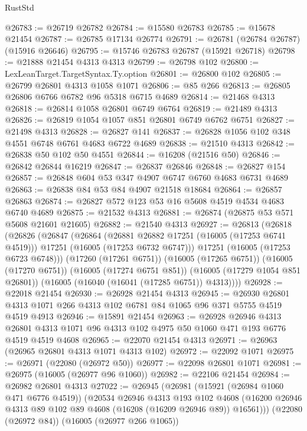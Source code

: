 \begin{lexlean}{RustStd}
\begin{coremodule}
@26783 := @26719 @26782
@26784 := @15580 @26783
@26785 := @15678 @21454
@26787 := @26785 @17134 @26774
@26791 := @26781 (@26784 @26787) (@15916 @26646)
@26795 := @15746 @26783 @26787 (@15921 @26718)
@26798 := @21888 @21454 @4313 @4313
@26799 := @26798 @102
@26800 := LexLeanTarget.TargetSyntax.Ty.option
@26801 := @26800 @102
@26805 := @26799 @26801 @4313 @1058 @1071
@26806 := @85 @266
@26813 := @26805 @26806 @6766 @6782 @96 @5318 @6715 @4689
@26814 := @21468 @4313
@26818 := @26814 @1058 @26801 @6749 @6764
@26819 := @21489 @4313
@26826 := @26819 @1054 @1057 @851 @26801 @6749 @6762 @6751
@26827 := @21498 @4313
@26828 := @26827 @141
@26837 := @26828 @1056 @102 @348 @4551 @6748 @6761 @4683 @6722 @4689
@26838 := @21510 @4313
@26842 := @26838 @50 @102 @50 @4551
@26844 := @16208 (@21516 @50)
@26846 := @26842 @26844 @16219
@26847 := @26837 @26846
@26848 := @26827 @154
@26857 := @26848 @604 @53 @347 @4907 @6747 @6760 @4683 @6731 @4689
@26863 := @26838 @84 @53 @84 @4907 @21518 @18684
@26864 := @26857 @26863
@26874 := @26827 @572 @123 @53 @16 @5608 @4519 @4534 @4683 @6740 @4689
@26875 := @21532 @4313
@26881 := @26874 (@26875 @53 @571 @5608 @21601 @21605)
@26882 := @21540 @4313
@26927 := @26813
    (@26818
      (@26826
        (@26847
          (@26864
            (@26881 @26882 @17251 (@16005 (@17253 @6741 @4519)))
            @17251
            (@16005 (@17253 @6732 @6747)))
          @17251
          (@16005 (@17253 @6723 @6748)))
        (@17260 (@17261 @6751))
        (@16005 (@17265 @6751))
        (@16005 (@17270 @6751))
        (@16005 (@17274 @6751 @851))
        (@16005 (@17279 @1054 @851 @26801))
        (@16005 (@16040 (@16041 (@17285 @6751)) @4313))))
@26928 := @22018 @21454
@26930 := @26928 @21454 @4313
@26945 := @26930 @26801 @4313 @1071 @266 @4313 @102 @6781 @84 @1065 @96 @371 @5755 @4519 @4519 @4913
@26946 := @15891 @21454
@26963 := @26928
    @26946
    @4313
    @26801
    @4313
    @1071
    @96
    @4313
    @102
    @4975
    @50
    @1060
    @471
    @193
    @6776
    @4519
    @4519
    @4608
@26965 := @22070 @21454 @4313
@26971 := @26963 (@26965 @26801 @4313 @1071 @4313 @102)
@26972 := @22092 @1071
@26975 := @26971 (@22080 (@26972 @50))
@26977 := @22098 @26801 @1071
@26981 := @26975 (@16005 (@26977 @96 @1060))
@26982 := @22106 @21454
@26984 := @26982 @26801 @4313
@27022 := @26945
    (@26981
      (@15921 (@26984 @1060 @471 @6776 @4519))
      (@20534
        @26946
        @4313
        @193
        @102
        @4608
        (@16200 @26946 @4313 @89 @102 @89 @4608 (@16208 (@16209 @26946 @89)) @16561)))
    (@22080 (@26972 @84))
    (@16005 (@26977 @266 @1065))

\end{coremodule}
\end{lexlean}
